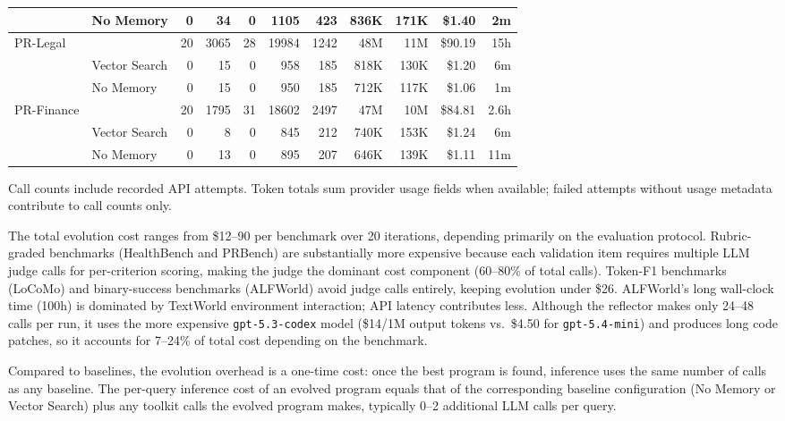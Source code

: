 \begin{table}[!htbp]
\begin{tabular}{@{}ll r rrrr rr r r@{}}
              & No Memory       &  0 &   34 &  0 &  1105 &  423 & 836K & 171K &  \$1.40 &  2m \\
\midrule
PR-Legal      & \sysname{} & 20 & 3065 & 28 & 19984 & 1242 & 48M & 11M & \$90.19 & 15h \\
              & Vector Search     &  0 &   15 &  0 &   958 &  185 & 818K & 130K &  \$1.20 &  6m \\
              & No Memory       &  0 &   15 &  0 &   950 &  185 & 712K & 117K &  \$1.06 &  1m \\
\midrule
PR-Finance    & \sysname{} & 20 & 1795 & 31 & 18602 & 2497 & 47M & 10M & \$84.81 & 2.6h \\
              & Vector Search     &  0 &    8 &  0 &   845 &  212 & 740K & 153K &  \$1.24 &  6m \\
              & No Memory       &  0 &   13 &  0 &   895 &  207 & 646K & 139K &  \$1.11 & 11m \\
\bottomrule
\end{tabular}
\vspace{0.3em}

{\footnotesize Call counts include recorded API attempts.
Token totals sum provider usage fields when available; failed attempts without usage metadata contribute to call counts only.}
\end{table}

The total evolution cost ranges from \$12--90 per benchmark over 20 iterations, depending primarily on the evaluation protocol.
Rubric-graded benchmarks (HealthBench and PRBench) are substantially more expensive because each validation item requires multiple LLM judge calls for per-criterion scoring, making the judge the dominant cost component (60--80\% of total calls).
Token-F1 benchmarks (LoCoMo) and binary-success benchmarks (ALFWorld) avoid judge calls entirely, keeping evolution under \$26.
ALFWorld's long wall-clock time (100h) is dominated by TextWorld environment interaction; API latency contributes less.
Although the reflector makes only 24--48 calls per run, it uses the more expensive \texttt{gpt-5.3-codex} model (\$14/1M output tokens vs.\ \$4.50 for \texttt{gpt-5.4-mini}) and produces long code patches, so it accounts for 7--24\% of total cost depending on the benchmark.

Compared to baselines, the evolution overhead is a one-time cost: once the best program is found, inference uses the same number of calls as any baseline.
The per-query inference cost of an evolved program equals that of the corresponding baseline configuration (No Memory or Vector Search) plus any toolkit calls the evolved program makes, typically 0--2 additional LLM calls per query.


